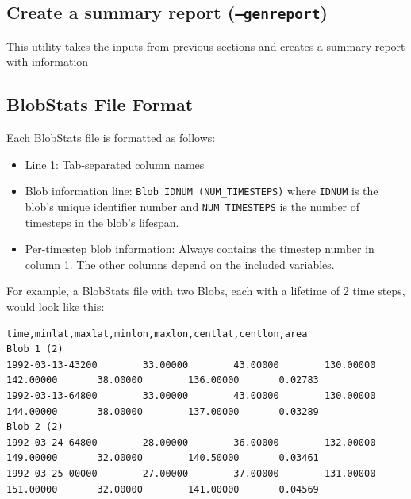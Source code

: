 \documentclass{article}
\begin{document}
\subsection{Create a summary report (\texttt{--genreport})}

This utility takes the inputs from previous sections and creates a summary report with information 
\pagebreak

\begin{appendix}
\section{BlobStats File Format}\label{blobformat}
Each BlobStats file is formatted as follows:\begin{itemize}
\item[] Line 1: Tab-separated column names 
\item[]Blob information line: \texttt{Blob IDNUM (NUM\_TIMESTEPS)} where \texttt{IDNUM} is the blob's unique identifier number and \texttt{NUM\_TIMESTEPS} is the number of timesteps in the blob's lifespan.
\item[] Per-timestep blob information: Always contains the timestep number in column 1. The other columns depend on the included variables. 
\end{itemize}

For example, a BlobStats file with two Blobs, each with a lifetime of 2 time steps, would look like this:

\begin{verbatim}
time,minlat,maxlat,minlon,maxlon,centlat,centlon,area
Blob 1 (2)
1992-03-13-43200        33.00000        43.00000        130.00000       142.00000       38.00000        136.00000       0.02783
1992-03-13-64800        33.00000        43.00000        130.00000       144.00000       38.00000        137.00000       0.03289
Blob 2 (2)
1992-03-24-64800        28.00000        36.00000        132.00000       149.00000       32.00000        140.50000       0.03461
1992-03-25-00000        27.00000        37.00000        131.00000       151.00000       32.00000        141.00000       0.04569
\end{verbatim}



\end{appendix}
\end{document}

